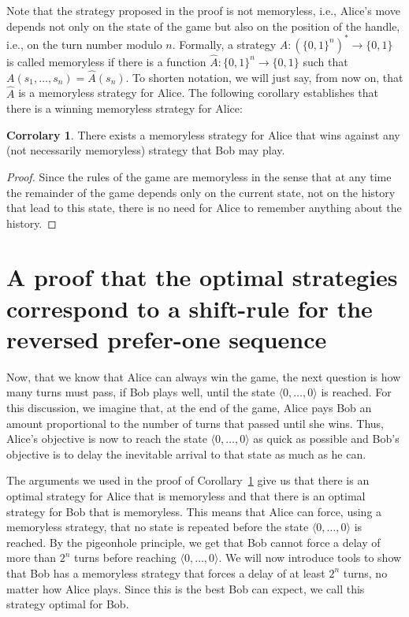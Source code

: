 \documentclass[final,12pt]{elsarticle}
\theoremstyle{definition} \newtheorem{definition}[theorem]{Definition} \newtheorem{observation}[theorem]{Observation} \newtheorem{example}[theorem]{Example} \newtheorem{remark}[theorem]{Remark} \newtheorem{corrolary}[theorem]{Corrolary}
\newcommand{\T}[1]{\langle{#1}\rangle} \DeclareMathOperator{\drop}{drop} \DeclareMathOperator{\dropbits}{drop\_bits} \DeclareMathOperator{\dropstates}{drop\_states} \DeclareMathOperator{\leadingForm}{LeadingForm} \DeclareMathOperator{\dv}{div} %
\begin{document}
Note that the strategy proposed in the proof is not memoryless, i.e., Alice's move depends not only on the state of the game but also on the position of the handle, i.e., on the turn number modulo $n$. Formally, a strategy $A \colon(\{0,1\}^n)^* \to \{0,1\}$ is called memoryless if there is a function $ \hat{A} \colon \{0,1\}^n \to\{0,1\}$ such that $A(s_1,\dots,s_n)= \hat{A}(s_n)$. To shorten notation, we will just say, from now on, that $ \hat{A}$ is a memoryless strategy for Alice. The following corollary establishes that there is a winning memoryless strategy for Alice:

\begin{corrolary}
	There exists a memoryless strategy for Alice that wins against any (not necessarily memoryless) strategy that Bob may play.
	\label{cor:memoryless}
\end{corrolary}
\begin{proof}
	Since the rules of the game are memoryless in the sense that at any time the remainder of the game depends only on the current state, not on the history that lead to this state, there is no need for Alice to remember anything about the history. 
\end{proof}

\section{A proof that the optimal strategies correspond to a shift-rule for the reversed prefer-one sequence}
\label{sec:optimal-strategies}

Now, that we know that Alice can always win the game, the next question is how many turns must pass, if Bob plays well, until the state $ \T{0,\dots,0}$ is reached. For this discussion, we imagine that, at the end of the game, Alice pays Bob an amount proportional to the number of turns that passed until she wins. Thus, Alice's objective is now to reach the state $\T{0,\dots,0}$ as quick as possible and Bob's objective is to delay the inevitable arrival to that state as much as he can. 

The arguments we used in the proof of Corollary~\ref{cor:memoryless} give us that there is an optimal strategy for Alice that is memoryless and that there is an optimal strategy for Bob that is memoryless. This means that Alice can force, using a memoryless strategy, that no state is repeated before the state $\T{0,\dots,0}$ is reached. By the pigeonhole principle, we get that Bob cannot force a delay of more than $2^n$ turns before reaching $ \T{0,\dots,0}$. We will now introduce tools to show that Bob has a memoryless strategy that forces a delay of at least $2^n$ turns, no matter how Alice plays. Since this is the best Bob can expect, we call this strategy optimal for Bob. 
\end{document}
